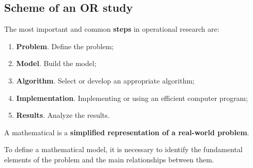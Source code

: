 \subsection{Scheme of an OR study}

The most important and common \textbf{steps} in operational research are:
\begin{enumerate}
    \item \textbf{Problem}. Define the problem;
    \item \textbf{Model}. Build the model;
    \item \textbf{Algorithm}. Select or develop an appropriate algorithm;
    \item \textbf{Implementation}. Implementing or using an efficient computer program;
    \item \textbf{Results}. Analyze the results.
\end{enumerate}

\begin{definitionbox}
    A mathematical  is a \textbf{simplified representation of a real-world problem}.
\end{definitionbox}

\noindent
To define a mathematical model, it is necessary to identify the fundamental elements of the problem and the main relationships between them.

